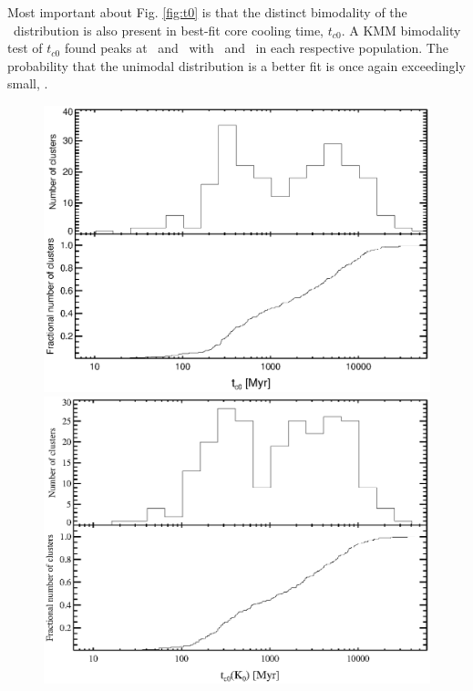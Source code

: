 Most important about Fig. \ref{fig:t0} is that the distinct bimodality
of the \kna\ distribution is also present in best-fit core cooling
time, $t_{c0}$. A KMM bimodality test of $t_{c0}$ found peaks at
\tckmma\ and \tckmmb\ with \tckmmc\ and \tckmmd\ in each respective
population. The probability that the unimodal distribution is a better
fit is once again exceedingly small, \tckmme.

\begin{figure}[htp]
  \begin{center}
    \begin{minipage}[htp]{0.8\linewidth}
      \includegraphics*[width=\textwidth, trim=20mm 10mm 10mm 10mm, clip]{t0}
    \end{minipage}
    \begin{minipage}[htp]{0.8\linewidth}
      \includegraphics*[width=\textwidth, trim=20mm 10mm 10mm 10mm, clip]{k0cool}

\end{minipage}
\end{center}
\end{figure}
